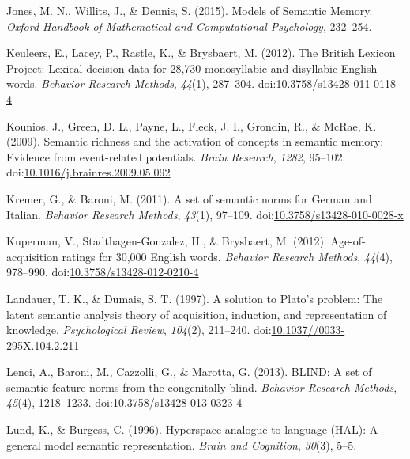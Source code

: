 \documentclass[english,,man]{apa6}
\begin{document}
\leavevmode\hypertarget{ref-Jones2015a}{}%
Jones, M. N., Willits, J., \& Dennis, S. (2015). Models of Semantic Memory. \emph{Oxford Handbook of Mathematical and Computational Psychology}, 232--254.

\leavevmode\hypertarget{ref-Keuleers2012}{}%
Keuleers, E., Lacey, P., Rastle, K., \& Brysbaert, M. (2012). The British Lexicon Project: Lexical decision data for 28,730 monosyllabic and disyllabic English words. \emph{Behavior Research Methods}, \emph{44}(1), 287--304. doi:\href{https://doi.org/10.3758/s13428-011-0118-4}{10.3758/s13428-011-0118-4}

\leavevmode\hypertarget{ref-Kounios2009}{}%
Kounios, J., Green, D. L., Payne, L., Fleck, J. I., Grondin, R., \& McRae, K. (2009). Semantic richness and the activation of concepts in semantic memory: Evidence from event-related potentials. \emph{Brain Research}, \emph{1282}, 95--102. doi:\href{https://doi.org/10.1016/j.brainres.2009.05.092}{10.1016/j.brainres.2009.05.092}

\leavevmode\hypertarget{ref-Kremer2011a}{}%
Kremer, G., \& Baroni, M. (2011). A set of semantic norms for German and Italian. \emph{Behavior Research Methods}, \emph{43}(1), 97--109. doi:\href{https://doi.org/10.3758/s13428-010-0028-x}{10.3758/s13428-010-0028-x}

\leavevmode\hypertarget{ref-Kuperman2012}{}%
Kuperman, V., Stadthagen-Gonzalez, H., \& Brysbaert, M. (2012). Age-of-acquisition ratings for 30,000 English words. \emph{Behavior Research Methods}, \emph{44}(4), 978--990. doi:\href{https://doi.org/10.3758/s13428-012-0210-4}{10.3758/s13428-012-0210-4}

\leavevmode\hypertarget{ref-Landauer1997}{}%
Landauer, T. K., \& Dumais, S. T. (1997). A solution to Plato's problem: The latent semantic analysis theory of acquisition, induction, and representation of knowledge. \emph{Psychological Review}, \emph{104}(2), 211--240. doi:\href{https://doi.org/10.1037//0033-295X.104.2.211}{10.1037//0033-295X.104.2.211}

\leavevmode\hypertarget{ref-Lenci2013}{}%
Lenci, A., Baroni, M., Cazzolli, G., \& Marotta, G. (2013). BLIND: A set of semantic feature norms from the congenitally blind. \emph{Behavior Research Methods}, \emph{45}(4), 1218--1233. doi:\href{https://doi.org/10.3758/s13428-013-0323-4}{10.3758/s13428-013-0323-4}

\leavevmode\hypertarget{ref-Lund1996}{}%
Lund, K., \& Burgess, C. (1996). Hyperspace analogue to language (HAL): A general model semantic representation. \emph{Brain and Cognition}, \emph{30}(3), 5--5.
\end{document}
